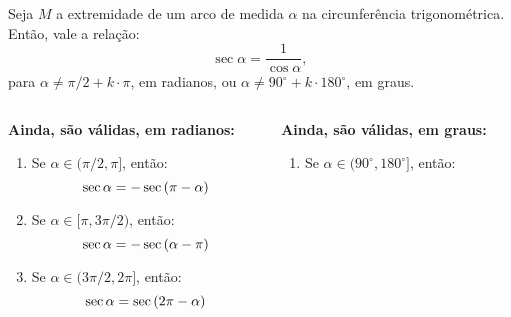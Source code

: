 \begin{frame}
  \begin{theorem}
    Seja $M$ a extremidade de um arco de medida $\alpha$ na circunferência trigonométrica. Então, vale a relação:
    \begin{equation*}
      \sec{\alpha} = \frac{1}{\cos{\alpha}},
    \end{equation*}
    para $\alpha\not=\pi/2+k\cdot\pi$, em radianos, ou $\alpha\not=90^{\circ}+k\cdot 180^{\circ}$, em graus.
  \end{theorem}
  \begin{columns}[onlytextwidth]
    \begin{column}{0.49\textwidth}
      \begin{highlight}
        \textbf{Ainda, são válidas, em radianos:}
        \begin{enumerate}
          \item Se $\alpha\in(\pi/2,\pi]$, então:\vspace*{-0.2cm}
          \begin{equation*}
            \sec{\alpha}=-\sec{(\pi-\alpha)}\vspace*{-0.2cm}
          \end{equation*}
          \item Se $\alpha\in[\pi,3\pi/2)$, então:\vspace*{-0.2cm}
          \begin{equation*}
            \sec{\alpha}=-\sec{(\alpha-\pi)}\vspace*{-0.2cm}
          \end{equation*}
          \item Se $\alpha\in(3\pi/2,2\pi]$, então:\vspace*{-0.2cm}
          \begin{equation*}
            \sec{\alpha}=\sec{(2\pi-\alpha)}\vspace*{-0.2cm}
          \end{equation*}
        \end{enumerate}
      \end{highlight}
    \end{column}
    \begin{column}{0.49\textwidth}
      \begin{highlight}
        \textbf{Ainda, são válidas, em graus:}
        \begin{enumerate}
          \item Se $\alpha\in(90^{\circ},180^{\circ}]$, então:\vspace*{-0.2cm}

\end{enumerate}
\end{highlight}
\end{column}
\end{columns}
\end{frame}
